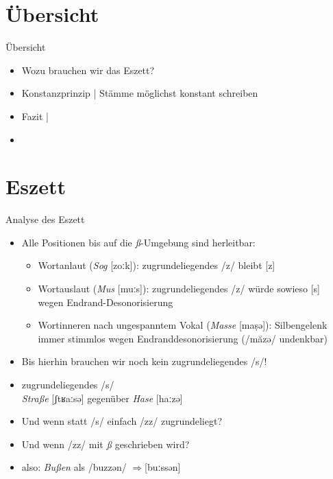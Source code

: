 \section{Übersicht}

\begin{frame}
  {Übersicht}
  \onslide<+->
  \begin{itemize}[<+->]
    \item Wozu brauchen wir das \alert{Eszett}?
      \Zeile
    \item \alert{Konstanzprinzip} | Stämme möglichst konstant schreiben
      \Zeile
    \item Fazit | 
      \Zeile
    \item \citet{Schaefer2018b}
  \end{itemize}
\end{frame}


\section{Eszett}

\newcommand{\phopro}{\ensuremath{\Rightarrow}}

\begin{frame}
  {Analyse des Eszett}
  \pause
  \begin{itemize}[<+->]
    \item \alert{Alle Positionen bis auf die \textit{ß}-Umgebung sind herleitbar:}
      \begin{itemize}[<+->]
        \item Wortanlaut (\textit{Sog} [zoːk]): zugrundeliegendes /z/ bleibt [z]
        \item Wortauslaut (\textit{Mus} [muːs]): zugrundeliegendes /z/ würde sowieso [s]\\
          wegen Endrand-Desonorisierung
        \item Wortinneren nach ungespanntem Vokal (\textit{Masse} [maṣə]): \alert{Silbengelenk}\\
          immer stimmlos wegen Endranddesonorisierung (/măzə/ undenkbar)
      \end{itemize}
      \Halbzeile
    \item \alert{Bis hierhin brauchen wir noch kein zugrundeliegendes /s/!}
      \Halbzeile
    \item zugrundeliegendes /s/ \\
      \textit{Straße} [ʃtʁaːsə] gegenüber \textit{Hase} [haːzə]
    \item \alert{Und wenn statt /s/ einfach /zz/ zugrundeliegt?}
    \item \alert{Und wenn /zz/ mit \textit{ß} geschrieben wird?}
    \item also: \textit{Bußen} als /buzzən/ \phopro [buːssən]
  \end{itemize}
\end{frame}


